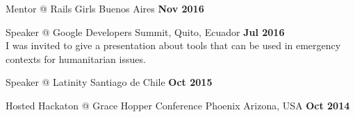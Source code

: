 \documentclass[margin,line]{resume}
\begin{document}
\begin{resume}
\begin{list2}
\item Mentor  @ Rails Girls Buenos Aires \hfill \textbf{Nov 2016}

\item Speaker @ Google Developers Summit, Quito, Ecuador \hfill \textbf{Jul 2016}  \\
I was invited to give a presentation about tools that can be used in emergency contexts for humanitarian issues.

\item Speaker @ Latinity Santiago de Chile \textbf{Oct 2015}

\item Hosted Hackaton @ Grace Hopper Conference Phoenix Arizona, USA \hfill \textbf{Oct 2014} 


\end{list2}



    

\end{resume}
\end{document}
